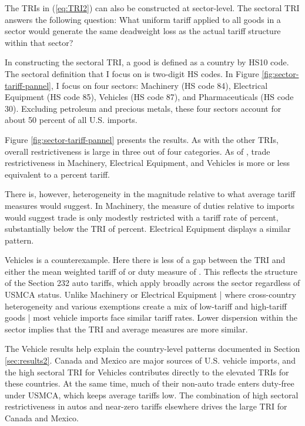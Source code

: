 \documentclass[12pt,pdftex]{article}
\begin{document}
\begin{onehalfspacing}
The TRIs in (\ref{eq:TRI2}) can also be constructed at sector-level. The sectoral TRI answers the following question: What uniform tariff applied to all goods in a sector would generate the same deadweight loss as the actual tariff structure within that sector?

In constructing the sectoral TRI, a good is defined as a country by HS10 code. The sectoral definition that I focus on is two-digit HS codes. In Figure \ref{fig:sector-tariff-pannel}, I focus on four sectors: Machinery (HS code 84), Electrical Equipment (HS code 85), Vehicles (HS code 87), and Pharmaceuticals (HS code 30). Excluding petroleum and precious metals, these four sectors account for about 50 percent of all U.S. imports.

Figure \ref{fig:sector-tariff-pannel} presents the results. As with the other TRIs, overall restrictiveness is large in three out of four categories. As of \currentdate{}, trade restrictiveness in Machinery, Electrical Equipment, and Vehicles is more or less equivalent to a \rmsValuetwofiveVehicles{} percent tariff.

There is, however, heterogeneity in the magnitude relative to what average tariff measures would suggest. In Machinery, the measure of duties relative to imports would suggest trade is only modestly restricted with a tariff rate of \simpleMeanValuetwofiveMachinery{} percent, substantially below the TRI of \rmsValuetwofiveMachinery{} percent. Electrical Equipment displays a similar pattern.

Vehicles is a counterexample. Here there is less of a gap between the TRI and either the mean weighted tariff of \meanWeightedValuetwofiveVehicles{} or duty measure of \simpleMeanValuetwofiveVehicles{}. This reflects the structure of the Section 232 auto tariffs, which apply broadly across the sector regardless of USMCA status. Unlike Machinery or Electrical Equipment | where cross-country heterogeneity and various exemptions create a mix of low-tariff and high-tariff goods | most vehicle imports face similar tariff rates. Lower dispersion within the sector implies that the TRI and average measures are more similar.

The Vehicle results help explain the country-level patterns documented in Section \ref{sec:results2}. Canada and Mexico are major sources of U.S. vehicle imports, and the high sectoral TRI for Vehicles contributes directly to the elevated TRIs for these countries. At the same time, much of their non-auto trade enters duty-free under USMCA, which keeps average tariffs low. The combination of high sectoral restrictiveness in autos and near-zero tariffs elsewhere drives the large TRI for Canada and Mexico.


\end{onehalfspacing}
\end{document}
